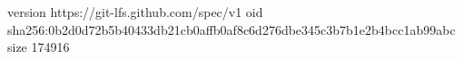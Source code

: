 version https://git-lfs.github.com/spec/v1
oid sha256:0b2d0d72b5b40433db21cb0affb0af8c6d276dbe345c3b7b1e2b4bcc1ab99abc
size 174916
